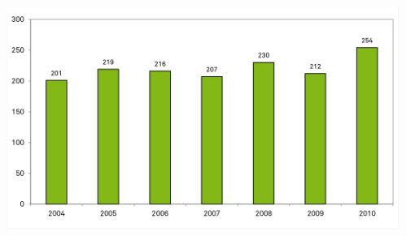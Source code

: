 \documentclass{beamer}
\begin{document}
\begin{frame}
\begin{columns}[T]
\begin{column}{0.5\textwidth}
        \end{column}
        \begin{column}{0.5\textwidth}
            \includegraphics[width=\textwidth]{./image24.jpg}
        \end{column}
    \end{columns}
\end{frame}
\end{document}
